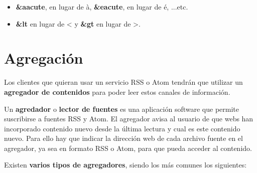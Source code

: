 \begin{itemize}
    \item \textbf{\&aacute}, en lugar de à, \textbf{\&eacute}, en lugar de é, ...etc.
    \item \textbf{\&lt} en lugar de < y \textbf{\&gt} en lugar de >.
\end{itemize}

\section{Agregación}
Los clientes que quieran usar un servicio RSS o Atom tendrán que utilizar un \textbf{agregador de contenidos} para poder leer estos canales de información.

Un \textbf{agredador} o \textbf{lector de fuentes} es una aplicación software que permite suscribirse a fuentes RSS y Atom. El agregador avisa al usuario de que webs han incorporado contenido nuevo  desde la última lectura y cual es este contenido nuevo. Para ello hay que indicar la dirección web de cada archivo fuente en el agregador, ya sea en formato RSS o Atom, para que pueda acceder al contenido.

Existen \textbf{varios tipos de agregadores}, siendo los más comunes los siguientes:

